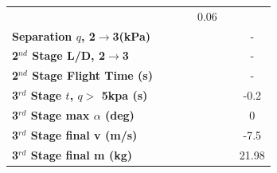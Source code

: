 \begin{table}[ht]
\begin{tabular}{l c c c c c c}
		& \secondthirdSeparationgammamThreeStandardNoReturn
		& \secondthirdSeparationgammamThreeOneHundredFiveNoReturn
		& \secondthirdSeparationgammamThreeOneHundredTenNoReturn
		&0.06
		\\
		\textbf{Separation $q$, 2$\rightarrow$3(kPa)}
		& \secondthirdSeparationqmThreeNinetyNoReturn
		& \secondthirdSeparationqmThreeNinetyFiveNoReturn
		& \secondthirdSeparationqmThreeStandardNoReturn
		& \secondthirdSeparationqmThreeOneHundredFiveNoReturn
		& \secondthirdSeparationqmThreeOneHundredTenNoReturn
		& -
		\\
		\textbf{2$^{nd}$ Stage L/D, 2$\rightarrow$3}
		& \secondthirdSeparationLDmThreeNinetyNoReturn
		& \secondthirdSeparationLDmThreeNinetyFiveNoReturn
		& \secondthirdSeparationLDmThreeStandardNoReturn
		& \secondthirdSeparationLDmThreeOneHundredFiveNoReturn
		& \secondthirdSeparationLDmThreeOneHundredTenNoReturn
		& -
		\\
		\textbf{2$^{nd}$ Stage Flight Time (s)}
		& \secondFlightTimemThreeNinetyNoReturn
		& \secondFlightTimemThreeNinetyFiveNoReturn
		& \secondFlightTimemThreeStandardNoReturn
		& \secondFlightTimemThreeOneHundredFiveNoReturn
		& \secondFlightTimemThreeOneHundredTenNoReturn
		& -
		\\
		\textbf{3$^{rd}$ Stage $t$, $q >$ 5kpa (s)}
		& \thirdqOverFivemThreeNinetyNoReturn
		& \thirdqOverFivemThreeNinetyFiveNoReturn
		& \thirdqOverFivemThreeStandardNoReturn
		& \thirdqOverFivemThreeOneHundredFiveNoReturn
		& \thirdqOverFivemThreeOneHundredTenNoReturn
		&-0.2
		\\
		\textbf{3$^{rd}$ Stage max $\alpha$ (deg)}
		& \thirdmaxAoAmThreeNinetyNoReturn
		& \thirdmaxAoAmThreeNinetyFiveNoReturn
		& \thirdmaxAoAmThreeStandardNoReturn
		& \thirdmaxAoAmThreeOneHundredFiveNoReturn
		& \thirdmaxAoAmThreeOneHundredTenNoReturn
		&0
		\\
		\textbf{3$^{rd}$ Stage final v (m/s)}
		& \thirdcircvmThreeNinetyNoReturn
		& \thirdcircvmThreeNinetyFiveNoReturn
		& \thirdcircvmThreeStandardNoReturn
		& \thirdcircvmThreeOneHundredFiveNoReturn
		& \thirdcircvmThreeOneHundredTenNoReturn
		&-7.5
		\\
		\textbf{3$^{rd}$ Stage final m (kg)}
		& \thirdcircmmThreeNinetyNoReturn
		& \thirdcircmmThreeNinetyFiveNoReturn
		& \thirdcircmmThreeStandardNoReturn
		& \thirdcircmmThreeOneHundredFiveNoReturn
		& \thirdcircmmThreeOneHundredTenNoReturn
		&21.98
		\\
		\hline 
	\end{tabular} 
\end{table}

